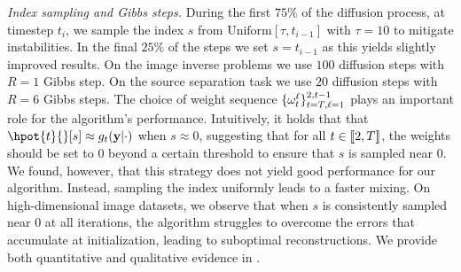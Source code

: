 \emph{Index sampling and Gibbs steps.} During the first $75\%$ of the diffusion process, at timestep $t_i$, we sample the index $s$ from $\mbox{Uniform}[\tau, t_{i-1}]$ with $\tau = 10$ to mitigate instabilities. In the final $25\%$ of the steps we set $s = t_{i-1}$ as this yields slightly improved results. On the image inverse problems we use $100$ diffusion steps with $R=1$ Gibbs step. On the source separation task we use $20$ diffusion steps with $R=6$ Gibbs steps. The choice of weight sequence $\{\omega^\ell _t\}^{2, t-1} _{t=T, \ell=1}$ plays an important role for the algorithm's performance. Intuitively, it holds that that $\hpot{t}{}[s] \approx \pot{t}{}$ when $s \approx 0$, suggesting that for all $t \in \llbracket 2, T \rrbracket$, the weights should be set to $0$ beyond a certain threshold to ensure that $s$ is sampled near $0$. We found, however, that this strategy does not yield good performance for our algorithm. Instead, sampling the index uniformly leads to a faster mixing. On high-dimensional image datasets, we observe that when $s$ is consistently sampled near $0$ at all iterations, the algorithm struggles to overcome the errors that accumulate at initialization, leading to suboptimal reconstructions. We provide both quantitative and qualitative evidence in . 

